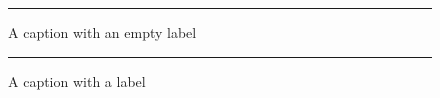 \documentclass{article}
\begin{document}
\begin{figure}[h]
  \centering
  \rule{4cm}{1cm}
  \captionsetup{labelformat=empty}
  \caption{A caption with an empty label}
\end{figure}

\begin{figure}[h]
  \centering
  \rule{4cm}{1cm}
  \caption{A caption with a label}
\end{figure}
\end{document}
